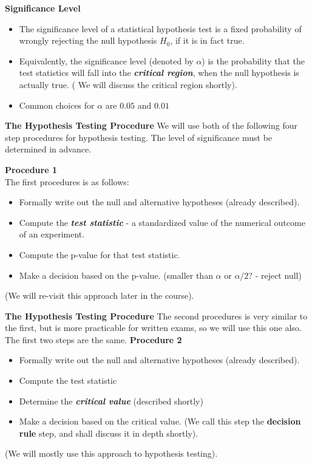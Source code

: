 \documentclass[a4]{beamer}
\begin{document}
{
\noindent \textbf{Significance Level}

\begin{itemize}
\item The significance level of a statistical hypothesis test is a fixed probability of wrongly rejecting the null hypothesis $H_0$, if it is in fact true.

\item Equivalently, the significance level (denoted by $\alpha$) is the probability that the test statistics will fall into the \textbf{\emph{critical region}}, when the null hypothesis is actually true. ( We will discuss the critical region shortly).

\item Common choices for $\alpha$ are $0.05$ and $0.01$
\end{itemize}
}



\noindent \textbf{The Hypothesis Testing Procedure }
We will use both of the following four step procedures for hypothesis testing. The level of significance must be determined in advance.

\textbf{Procedure 1}\\
The first procedures is as follows:

\begin{itemize}
\item Formally write out the null and alternative hypotheses (already described).
\item Compute the \emph{\textbf{test statistic}} - a standardized value of the numerical outcome of an experiment.
\item Compute the p-value for that test statistic.
\item Make a decision based on the p-value. (smaller than $\alpha$ or $\alpha/2$? - reject null)
\end{itemize}
(We will re-visit this approach later in the course).




\noindent \textbf{The Hypothesis Testing Procedure }
The second procedures is very similar to the first, but is more practicable for written exams, so we will use this one also. The first two steps are the same.
\textbf{Procedure 2}\\
\begin{itemize}
\item Formally write out the null and alternative hypotheses (already described).
\item Compute the test statistic
\item Determine the \emph{\textbf{critical value}} (described shortly)
\item Make a decision based on the critical value. (We call this step the \textbf{decision rule} step, and shall discuss it in depth shortly).
\end{itemize}
(We will mostly use this approach to hypothesis testing).
\end{document}
